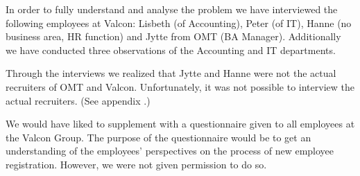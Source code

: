 In order to fully understand and analyse the problem we have interviewed the following employees at Valcon:
Lisbeth (of Accounting), Peter (of IT), Hanne (no business area, HR function) and Jytte from OMT (BA Manager).
Additionally we have conducted three observations of the Accounting and IT departments.

Through the interviews we realized that Jytte and Hanne were not the actual recruiters of OMT and Valcon.
Unfortunately, it was not possible to interview the actual recruiters.
(See appendix .)

We would have liked to supplement with a questionnaire given to all employees at the Valcon Group.
The purpose of the questionnaire would be to get an understanding of the employees' perspectives on the process of new employee registration.
However, we were not given permission to do so.